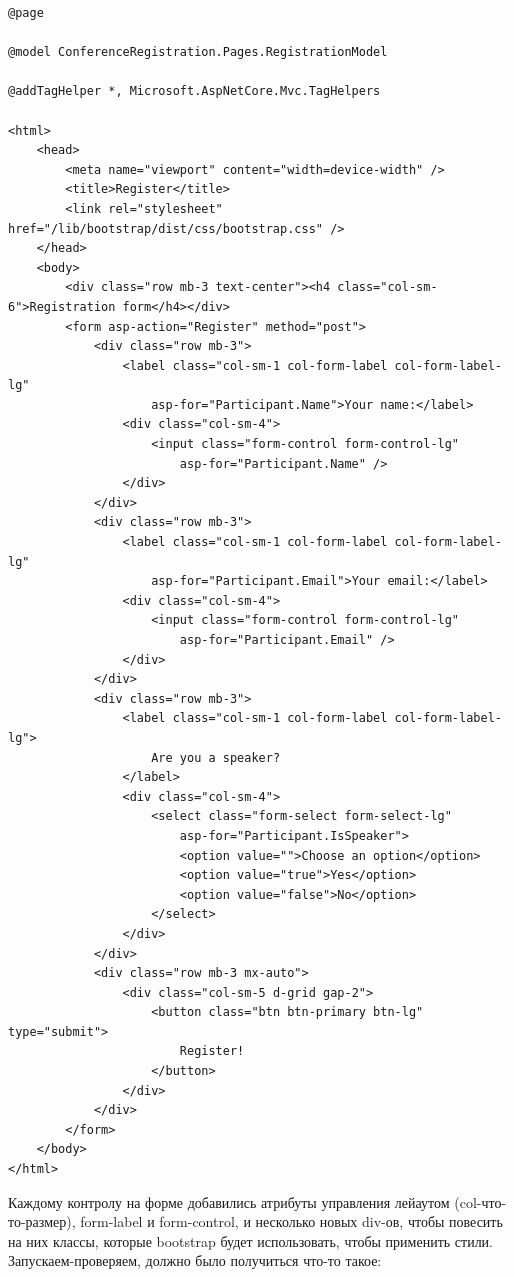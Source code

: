 \documentclass{../../text-style}
\begin{document}
\begin{verbatim}
@page

@model ConferenceRegistration.Pages.RegistrationModel

@addTagHelper *, Microsoft.AspNetCore.Mvc.TagHelpers

<html>
    <head>
        <meta name="viewport" content="width=device-width" />
        <title>Register</title>
        <link rel="stylesheet" href="/lib/bootstrap/dist/css/bootstrap.css" />
    </head>
    <body>
        <div class="row mb-3 text-center"><h4 class="col-sm-6">Registration form</h4></div>
        <form asp-action="Register" method="post">
            <div class="row mb-3">
                <label class="col-sm-1 col-form-label col-form-label-lg" 
                    asp-for="Participant.Name">Your name:</label>
                <div class="col-sm-4">
                    <input class="form-control form-control-lg" 
                        asp-for="Participant.Name" />
                </div>
            </div>
            <div class="row mb-3">
                <label class="col-sm-1 col-form-label col-form-label-lg" 
                    asp-for="Participant.Email">Your email:</label>
                <div class="col-sm-4">
                    <input class="form-control form-control-lg" 
                        asp-for="Participant.Email" />
                </div>
            </div>
            <div class="row mb-3">
                <label class="col-sm-1 col-form-label col-form-label-lg">
                    Are you a speaker?
                </label>
                <div class="col-sm-4">
                    <select class="form-select form-select-lg" 
                        asp-for="Participant.IsSpeaker">
                        <option value="">Choose an option</option>
                        <option value="true">Yes</option>
                        <option value="false">No</option>
                    </select>
                </div>
            </div>
            <div class="row mb-3 mx-auto">
                <div class="col-sm-5 d-grid gap-2">
                    <button class="btn btn-primary btn-lg" type="submit">
                        Register!
                    </button>
                </div>
            </div>
        </form>
    </body>
</html>
\end{verbatim}

Каждому контролу на форме добавились атрибуты управления лейаутом (col-что-то-размер), form-label и form-control, и несколько новых div-ов, чтобы повесить на них классы, которые bootstrap будет использовать, чтобы применить стили. Запускаем-проверяем, должно было получиться что-то такое:
\end{document}
